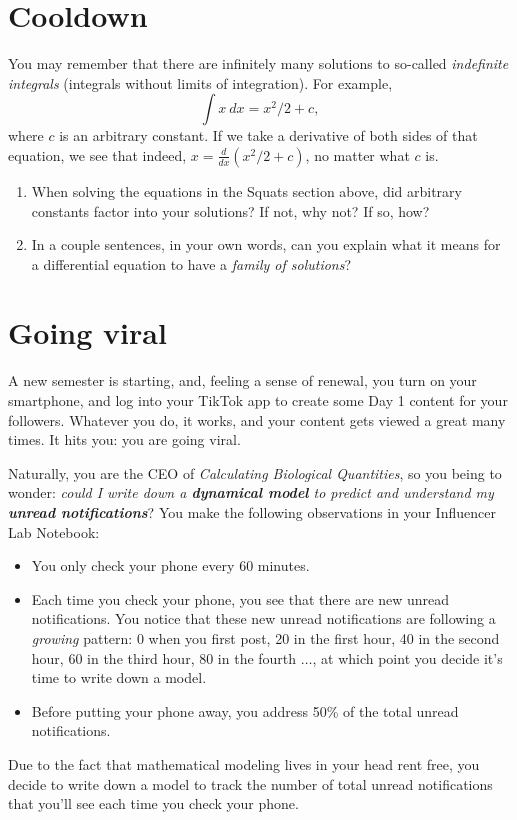 \documentclass[11pt,onecolumn,superscriptaddress,notitlepage]{article}
\begin{document}
\section*{Cooldown}
You may remember that there are infinitely many solutions to so-called {\it indefinite integrals} (integrals without limits of integration). For example, $$\int x \ dx = x^{2}/2 + c,$$ where $c$ is an arbitrary constant. If we take a derivative of both sides of that equation, we see that indeed, $x = \frac{d}{dx} \left(x^2/2+c\right)$, no matter what $c$ is.
\begin{enumerate}[resume]
	\item When solving the equations in the Squats section above, did arbitrary constants factor into your solutions? If not, why not? If so, how?
	\item In a couple sentences, in your own words, can you explain what it means for a differential equation to have a {\it family of solutions}?  
\end{enumerate}

\clearpage
\section*{Going viral}

A new semester is starting, and, feeling a sense of renewal, you turn on your smartphone, and log into your TikTok app to create some Day 1 content for your followers. Whatever you do, it works, and your content gets viewed a great many times. It hits you: you are going viral.

Naturally, you are the CEO of {\it Calculating Biological Quantities}, so you being to wonder: {\it could I write down a {\bf dynamical model} to predict and understand my {\bf unread notifications}}? You make the following observations in your Influencer Lab Notebook:
\begin{itemize}
	\item	You only check your phone every 60 minutes.
	\item Each time you check your phone, you see that there are new unread notifications. You notice that these new unread notifications are following a {\it growing} pattern: 0 when you first post, 20 in the first hour, 40 in the second hour, 60 in the third hour, 80 in the fourth $\dots$, at which point you decide it's time to write down a model. 
	\item Before putting your phone away, you address 50\% of the total unread notifications.
\end{itemize} 
Due to the fact that mathematical modeling lives in your head rent free, you decide to write down a model to track the number of total unread notifications that you'll see each time you check your phone. 
\end{document}
